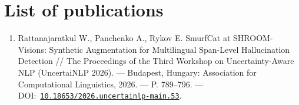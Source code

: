 \chapter{List of publications}

{\raggedright
\begin{enumerate}
    \item Rattanajaratkul W., Panchenko A., Rykov E. SmurfCat at SHROOM-Visions: Synthetic Augmentation for Multilingual Span-Level Hallucination Detection // The Proceedings of the Third Workshop on Uncertainty-Aware NLP (UncertaiNLP 2026). --- Budapest, Hungary: Association for Computational Linguistics, 2026. --- P. 789--796. --- DOI:~\href{https://doi.org/10.18653/2026.uncertainlp-main.53}{\nolinkurl{10.18653/2026.uncertainlp-main.53}}.
\end{enumerate}
}
